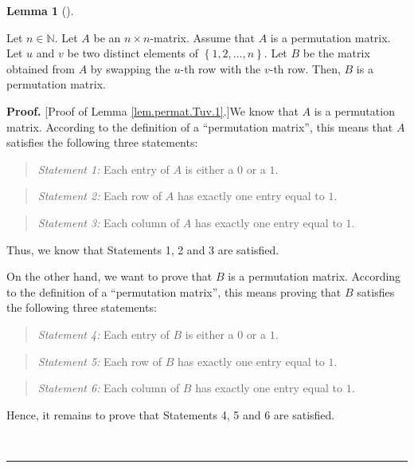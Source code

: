 \documentclass[numbers=enddot,12pt,final,onecolumn,notitlepage]{scrartcl}%
\theoremstyle{definition}
\newtheorem{lem}[theo]{Lemma}
\newenvironment{lemma}[1][]
{\begin{lem}[#1]\begin{leftbar}}
{\end{leftbar}\end{lem}}
\newenvironment{statement}{\begin{quote}}{\end{quote}}
\newenvironment{proof}[1][Proof]{\noindent\textbf{#1.} }{\ \rule{0.5em}{0.5em}}
\begin{document}
\begin{lemma}
\label{lem.permat.Tuv.1}Let $n\in\mathbb{N}$. Let $A$ be an $n\times
n$-matrix. Assume that $A$ is a permutation matrix. Let $u$ and $v$ be two
distinct elements of $\left\{  1,2,\ldots,n\right\}  $. Let $B$ be the matrix
obtained from $A$ by swapping the $u$-th row with the $v$-th row. Then, $B$ is
a permutation matrix.
\end{lemma}

\begin{proof}
[Proof of Lemma \ref{lem.permat.Tuv.1}.]We know that $A$ is a permutation
matrix. According to the definition of a \textquotedblleft permutation
matrix\textquotedblright, this means that $A$ satisfies the following three statements:

\begin{statement}
\textit{Statement 1:} Each entry of $A$ is either a $0$ or a $1$.
\end{statement}

\begin{statement}
\textit{Statement 2:} Each row of $A$ has exactly one entry equal to $1$.
\end{statement}

\begin{statement}
\textit{Statement 3:} Each column of $A$ has exactly one entry equal to $1$.
\end{statement}

Thus, we know that Statements 1, 2 and 3 are satisfied.

On the other hand, we want to prove that $B$ is a permutation matrix.
According to the definition of a \textquotedblleft permutation
matrix\textquotedblright, this means proving that $B$ satisfies the following
three statements:

\begin{statement}
\textit{Statement 4:} Each entry of $B$ is either a $0$ or a $1$.
\end{statement}

\begin{statement}
\textit{Statement 5:} Each row of $B$ has exactly one entry equal to $1$.
\end{statement}

\begin{statement}
\textit{Statement 6:} Each column of $B$ has exactly one entry equal to $1$.
\end{statement}

Hence, it remains to prove that Statements 4, 5 and 6 are satisfied.


\end{proof}
\end{document}
